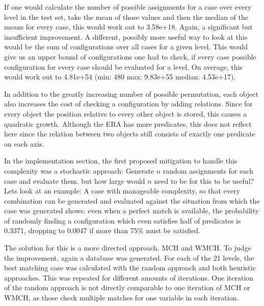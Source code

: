If one would calculate the number of possible assignments for a case over every level in the test set, take the mean of those values and then the median of the means for every case, this would work out to 3.58e+18. Again, a significant but insufficient improvement.
A different, possibly more useful way to look at this would be the sum of configurations over all cases for a given level. This would give us an upper bound of configurations one had to check, if every case possible configuration for every case should be evaluated for a level. On average, this would work out to 4.81e+54 (min: 480 max: 9.83e+55 median: 4.53e+17).

In addition to the greatly increasing number of possible permutation, each object also increases the cost of checking a configuration by adding relations.
Since for every object the position relative to every other object is stored, this causes a quadratic growth. Although the ERA has more predicates, this does not reflect here since the relation between two objects still consists of exactly one predicate on each axis.


In the implementation section, the first proposed mitigation to handle this complexity was a stochastic approach: Generate $n$ random assignments for each case and evaluate them. but how large would $n$ need to be for this to be useful?
Lets look at an example: A case with manageable complexity, so that every combination can be generated and evaluated against the situation from which the case was generated shows: even when a perfect match is available, the probability of randomly finding a configuration which even satisfies half of predicates is 0.3371, dropping to 0.0047 if more than 75\% must be satisfied.


The solution for this is a more directed approach, \ac{MCH} and \ac{WMCH}. To judge the improvement, again a database was generated.
For each of the 21 levels, the best matching case was calculated with the random approach and both heuristic approaches. This was repeated for different amounts of iterations. One iteration of the random approach is not directly comparable to one iteration of \ac{MCH} or \ac{WMCH}, as those check multiple matches for one variable in each iteration.

